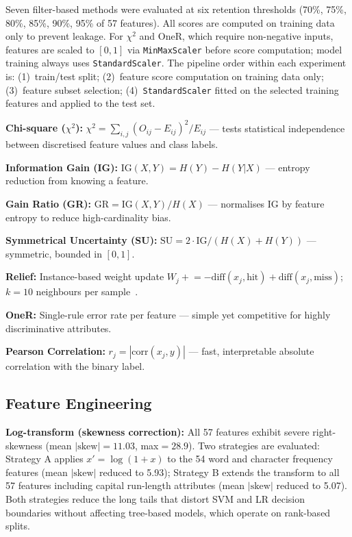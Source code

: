 \documentclass[conference]{IEEEtran}
\begin{document}
Seven filter-based methods were evaluated at six retention
thresholds (70\%, 75\%, 80\%, 85\%, 90\%, 95\% of 57 features).
All scores are computed on training data only to prevent leakage.
For $\chi^2$ and OneR, which require non-negative inputs, features are
scaled to $[0,1]$ via \texttt{MinMaxScaler} before score computation;
model training always uses \texttt{StandardScaler}.
The pipeline order within each experiment is: (1)~train/test split;
(2)~feature score computation on training data only;
(3)~feature subset selection; (4)~\texttt{StandardScaler} fitted on
the selected training features and applied to the test set.

\textbf{Chi-square ($\chi^2$):}
$\chi^2=\sum_{i,j}(O_{ij}-E_{ij})^2/E_{ij}$ --- tests
statistical independence between discretised feature values
and class labels.

\textbf{Information Gain (IG):}
$\text{IG}(X,Y)=H(Y)-H(Y|X)$ --- entropy reduction from
knowing a feature.

\textbf{Gain Ratio (GR):} $\text{GR}=\text{IG}(X,Y)/H(X)$
--- normalises IG by feature entropy to reduce high-cardinality
bias.

\textbf{Symmetrical Uncertainty (SU):}
$\text{SU}=2\cdot\text{IG}/(H(X)+H(Y))$ --- symmetric,
bounded in $[0,1]$.

\textbf{Relief:} Instance-based weight update
$W_j\mathrel{+}=-\text{diff}(x_j,\text{hit})
+\text{diff}(x_j,\text{miss})$; $k=10$ neighbours per
sample~\cite{ref8}.

\textbf{OneR:} Single-rule error rate per feature --- simple
yet competitive for highly discriminative attributes.

\textbf{Pearson Correlation:}
$r_j=|\text{corr}(x_j,y)|$ --- fast, interpretable absolute
correlation with the binary label.

\subsection{Feature Engineering}
\label{sec:engineering}

\textbf{Log-transform (skewness correction):} All 57 features
exhibit severe right-skewness (mean $|\text{skew}|=11.03$,
max$=28.9$). Two strategies are evaluated: Strategy A applies
$x'=\log(1+x)$ to the 54 word and character frequency features
(mean $|\text{skew}|$ reduced to 5.93); Strategy B extends the
transform to all 57 features including capital run-length
attributes (mean $|\text{skew}|$ reduced to 5.07). Both
strategies reduce the long tails that distort SVM and LR
decision boundaries without affecting tree-based models, which
operate on rank-based splits.
\end{document}
